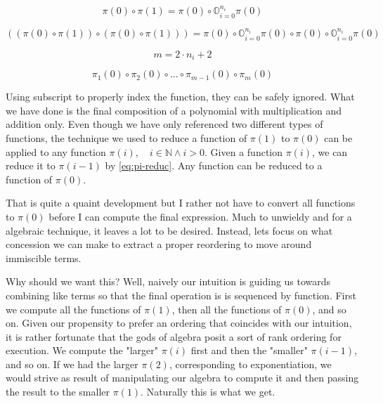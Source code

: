 \begin{equation}
    \pi(0) \circ \pi(1) = \pi(0) \circ \mathbb{O}_{i=0}^{n_i} \pi(0)
\end{equation}

\begin{equation}
    ((\pi(0) \circ \pi(1)) \circ (\pi(0) \circ \pi(1)))  = \pi(0) \circ \mathbb{O}_{i=0}^{n_i} \pi(0) \circ \pi(0) \circ \mathbb{O}_{i=0}^{n_i} \pi(0)
\end{equation}

\begin{equation}
    m = 2 \cdot n_i + 2
\end{equation}

\begin{equation}
    \pi_1(0) \circ \pi_2(0) \circ \dots \circ \pi_{m-1}(0) \circ \pi_m(0)
\end{equation}

Using subscript to properly index the function, they can be safely ignored.
What we have done is the final composition of a polynomial with multiplication
and addition only. Even though we have only referenced two different types of
functions, the technique we used to reduce a function of $\pi(1)$ to $\pi(0)$
can be applied to any function $\pi(i), \quad i \in \mathbb{N} \land i > 0$.
Given a function $\pi(i)$, we can reduce it to $\pi(i-1)$ by \ref{eq:pi-reduc}.
Any function can be reduced to a function of $\pi(0)$.

That is quite a quaint development but I rather not have to convert all
functions to $\pi(0)$ before I can compute the final expression. Much to
unwieldy and for a algebraic technique, it leaves a lot to be desired. Instead,
lets focus on what concession we can make to extract a proper reordering to
move around immiscible terms.

Why should we want this? Well, naively our intuition is guiding us towards
combining like terms so that the final operation is is sequenced by function.
First we compute all the functions of $\pi(1)$, then all the functions of
$\pi(0)$, and so on. Given our propensity to prefer an ordering that coincides
with our intuition, it is rather fortunate that the gods of algebra posit a
sort of rank ordering for execution. We compute the "larger" $\pi(i)$ first and
then the "smaller" $\pi(i-1)$, and so on. If we had the larger $\pi(2)$,
corresponding to exponentiation, we would strive as result of manipulating our
algebra to compute it and then passing the result to the smaller $\pi(1)$.
Naturally this is what we get.

